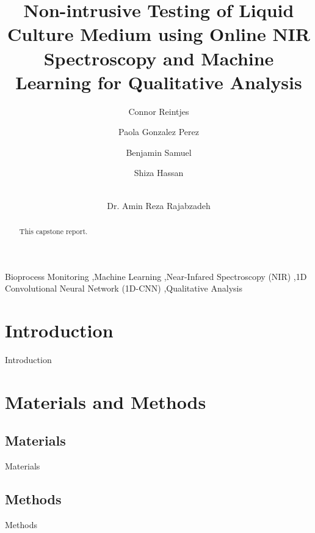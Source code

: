 \documentclass[final, 3p, 11pt]{elsarticle}
\begin{document}
\begin{frontmatter}


\title{Non-intrusive Testing of Liquid Culture Medium using Online NIR Spectroscopy and Machine Learning for Qualitative Analysis}

\author[1]{Connor Reintjes}
\author[1]{Paola Gonzalez Perez}
\author[1]{Benjamin Samuel}
\author[1]{Shiza Hassan}
\author[1]{\\Dr. Amin Reza Rajabzadeh} %



\begin{abstract}
This capstone report.
\end{abstract}

\begin{keyword}
Bioprocess Monitoring \sep Machine Learning \sep Near-Infared Spectroscopy (NIR) \sep 1D Convolutional Neural Network (1D-CNN) \sep Qualitative Analysis
\end{keyword}

\end{frontmatter}

\section{Introduction}
Introduction

\section{Materials and Methods}
\subsection{Materials}
Materials

\subsection{Methods}
Methods
\end{document}
